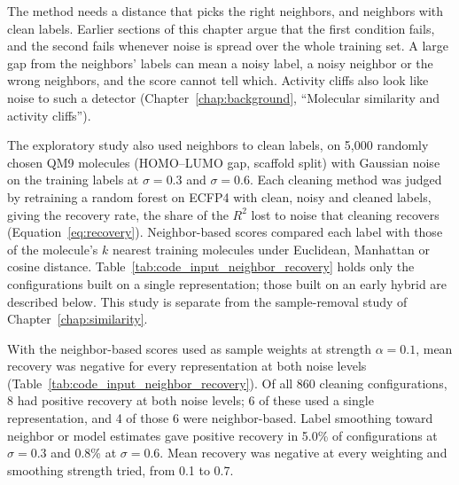 The method needs a distance that picks the right neighbors, and neighbors with clean labels. Earlier sections of this chapter argue that the first condition fails, and the second fails whenever noise is spread over the whole training set. A large gap from the neighbors' labels can mean a noisy label, a noisy neighbor or the wrong neighbors, and the score cannot tell which. Activity cliffs also look like noise to such a detector (Chapter~\ref{chap:background}, ``Molecular similarity and activity cliffs'').

The exploratory study also used neighbors to clean labels, on 5,000 randomly chosen QM9 molecules (HOMO--LUMO gap, scaffold split) with Gaussian noise on the training labels at $\sigma = 0.3$ and $\sigma = 0.6$. Each cleaning method was judged by retraining a random forest on ECFP4 with clean, noisy and cleaned labels, giving the recovery rate, the share of the $R^2$ lost to noise that cleaning recovers (Equation~\ref{eq:recovery}). Neighbor-based scores compared each label with those of the molecule's $k$ nearest training molecules under Euclidean, Manhattan or cosine distance. Table~\ref{tab:code_input_neighbor_recovery} holds only the configurations built on a single representation; those built on an early hybrid are described below. This study is separate from the sample-removal study of Chapter~\ref{chap:similarity}.

With the neighbor-based scores used as sample weights at strength $\alpha = 0.1$, mean recovery was negative for every representation at both noise levels (Table~\ref{tab:code_input_neighbor_recovery}). Of all 860 cleaning configurations, 8 had positive recovery at both noise levels; 6 of these used a single representation, and 4 of those 6 were neighbor-based. Label smoothing toward neighbor or model estimates gave positive recovery in 5.0\% of configurations at $\sigma = 0.3$ and 0.8\% at $\sigma = 0.6$. Mean recovery was negative at every weighting and smoothing strength tried, from 0.1 to 0.7.


